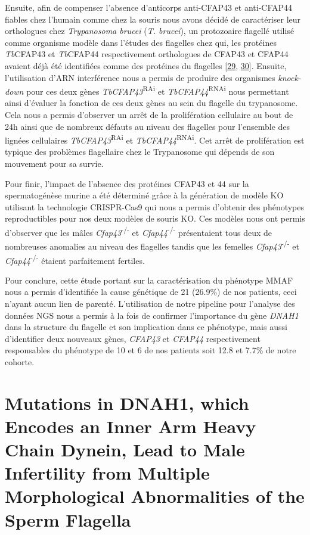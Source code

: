\documentclass[12pt,twoside]{ugathesis}
\begin{document}
Ensuite, afin de compenser l'absence d'anticorps anti-CFAP43 et
anti-CFAP44 fiables chez l'humain comme chez la souris nous avons décidé
de caractériser leur orthologues chez \emph{Trypanosoma brucei}
(\emph{T. brucei}), un protozoaire flagellé utilisé comme organisme
modèle dans l'études des flagelles chez qui, les protéines
\emph{Tb}CFAP43 et \emph{Tb}CFAP44 respectivement orthologues de CFAP43
et CFAP44 avaient déjà été identifiées comme des protéines du flagelles
{[}\protect\hyperlink{ref-Broadhead2006}{29},
\protect\hyperlink{ref-Subota2014}{30}{]}. Ensuite, l'utilisation d'ARN
interférence nous a permis de produire des organismes \emph{knock-down}
pour ces deux gènes \emph{TbCFAP43}\textsuperscript{RAi} et
\emph{TbCFAP44}\textsuperscript{RNAi} nous permettant ainsi d'évaluer la
fonction de ces deux gènes au sein du flagelle du trypanosome. Cela nous
a permis d'observer un arrêt de la prolifération cellulaire au bout de
24h ainsi que de nombreux défauts au niveau des flagelles pour
l'ensemble des lignées cellulaires \emph{TbCFAP43}\textsuperscript{RAi}
et \emph{TbCFAP44}\textsuperscript{RNAi}. Cet arrêt de prolifération est
typique des problèmes flagellaire chez le Trypanosome qui dépends de son
mouvement pour sa survie.

Pour finir, l'impact de l'absence des protéines CFAP43 et 44 sur la
spermatogénèse murine a été déterminé grâce à la génération de modèle KO
utilisant la technologie CRISPR-Cas9 qui nous a permis d'obtenir des
phénotypes reproductibles pour nos deux modèles de souris KO. Ces
modèles nous ont permis d'observer que les mâles
\emph{Cfap43}\textsuperscript{-/-} et \emph{Cfap44}\textsuperscript{-/-}
présentaient tous deux de nombreuses anomalies au niveau des flagelles
tandis que les femelles \emph{Cfap43}\textsuperscript{-/-} et
\emph{Cfap44}\textsuperscript{-/-} étaient parfaitement fertiles.

Pour conclure, cette étude portant sur la caractérisation du phénotype
MMAF nous a permis d'identifiée la cause génétique de 21 (26.9\%) de nos
patients, ceci n'ayant aucun lien de parenté. L'utilisation de notre
pipeline pour l'analyse des données NGS nous a permis à la fois de
confirmer l'importance du gène \emph{DNAH1} dans la structure du
flagelle et son implication dans ce phénotype, mais aussi d'identifier
deux nouveaux gènes, \emph{CFAP43} et \emph{CFAP44} respectivement
responsables du phénotype de 10 et 6 de nos patients soit 12.8 et 7.7\%
de notre cohorte.

\appendix

\hypertarget{dnah12014}{\chapter{Mutations in DNAH1, which Encodes an
Inner Arm Heavy Chain Dynein, Lead to Male Infertility from Multiple
Morphological Abnormalities of the Sperm Flagella}\label{dnah12014}}
\end{document}
